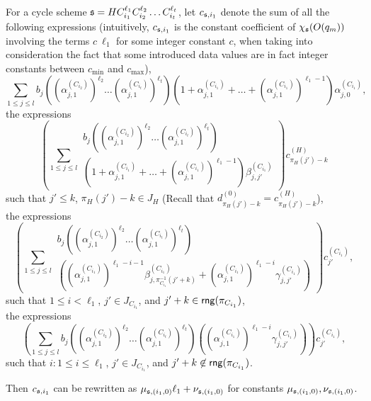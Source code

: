 \begin{appendix}
For a cycle scheme ${\mathfrak{s} }=HC_{i_1}^{\ell_1} C_{i_2}^{\ell_2} \dots C_{i_t}^{\ell_t}$, let $c_{{\mathfrak{s} },i_1}$ denote the sum of all the following expressions (intuitively, $c_{{\mathfrak{s} },i_1}$ is the constant coefficient of $\chi_{\mathfrak{s} }(O(q_m))$ involving the terms $ c\ \ell_1$ for some integer constant $c$, when taking into consideration the fact that some introduced data values are in fact integer constants between $c_{\min}$ and $c_{\max}$),
\[
\sum \limits_{1 \le j \le l} 
b_j \left((\alpha^{(C_{i_2})}_{j,1})^{\ell_2} \dots (\alpha^{(C_{i_t})}_{j,1})^{\ell_t}\right) 
\left(1+\alpha^{(C_{i_1})}_{j,1} + \dots + (\alpha^{(C_{i_1})}_{j,1})^{\ell_1-1} \right) \alpha^{(C_{i_1})}_{j,0},
\]
the expressions 
\[
\left(\sum \limits_{1 \le j \le l} 
\begin{array}{l}
b_j \left((\alpha^{(C_{i_2})}_{j,1})^{\ell_2} \dots (\alpha^{(C_{i_t})}_{j,1})^{\ell_t}\right) \\
\left(1+\alpha^{(C_{i_1})}_{j,1} + \dots + (\alpha^{(C_{i_1})}_{j,1})^{\ell_1-1} \right) \beta^{(C_{i_1})}_{j,j'}
\end{array}
\right) c^{(H)}_{\pi_H(j')-k}
\]
such that $j' \le k$, $\pi_H(j')-k \in J_H$ (Recall that $d^{(0)}_{\pi_H(j')-k}=c^{(H)}_{\pi_H(j')-k}$), \\
the expressions
\[
\left(\sum \limits_{1 \le j \le l} 
\begin{array}{l}
b_j \left((\alpha^{(C_{i_2})}_{j,1})^{\ell_2} \dots (\alpha^{(C_{i_t})}_{j,1})^{\ell_t}\right) \\
\left((\alpha^{(C_{i_1})}_{j,1})^{\ell_1-i-1} \beta^{(C_{i_1})}_{j,\pi^{-1}_{C_{i_1}}(j'+k)} + (\alpha^{(C_{i_1})}_{j,1})^{\ell_1-i} \gamma^{(C_{i_1})}_{j,j'}\right)
\end{array}
\right) c^{(C_{i_1})}_{j'},
\]
such that $1 \le i < \ell_1$, $j' \in J_{C_{i_1}}$, and $j'+k \in \mathsf{rng}(\pi_{C_{i_1}})$,\\
the expressions
\[
\left(\sum \limits_{1 \le j \le l} 
b_j \left((\alpha^{(C_{i_2})}_{j,1})^{\ell_2} \dots (\alpha^{(C_{i_t})}_{j,1})^{\ell_t}\right)  \left( (\alpha^{(C_{i_1})}_{j,1})^{\ell_1-i} \gamma^{(C_{i_1})}_{j,j'}\right)
\right) c^{(C_{i_1})}_{j'},
\]
such that $i: 1 \le i \le \ell_1$, $j' \in J_{C_{i_1}}$, and $j'+k \not \in \mathsf{rng}(\pi_{C_{i_1}})$.

Then $c_{{\mathfrak{s} },i_1}$ can be rewritten as $\mu_{{\mathfrak{s} }, (i_1,0)} \ell_1 + \nu_{{\mathfrak{s} }, (i_1,0)}$ for constants $\mu_{{\mathfrak{s} }, (i_1,0)},\nu_{{\mathfrak{s} }, (i_1,0)}$.


\end{appendix}

